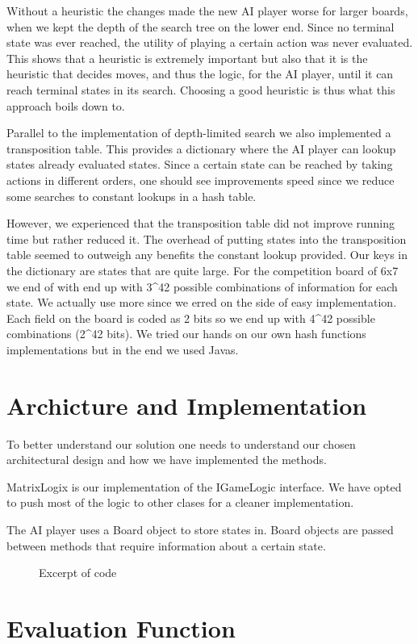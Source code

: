 \documentclass[11pt, a4paper]{article}
\begin{document}
Without a heuristic the changes made the new AI player worse for larger boards,
when we kept the depth of the search tree on the lower end. Since no terminal
state was ever reached, the utility of playing a certain action was never
evaluated. This shows that a heuristic is extremely important but also that it
is the heuristic that decides moves, and thus the logic, for the AI player,
until it can reach terminal states in its search. Choosing a good heuristic is
thus what this approach boils down to.

Parallel to the implementation of depth-limited search we also implemented a
transposition table. This provides a dictionary where the AI player can lookup
states already evaluated states. Since a certain state can be reached by taking
actions in different orders, one should see improvements speed since we
reduce some searches to constant lookups in a hash table. 

However, we experienced that the transposition table did not improve running
time but rather reduced it. The overhead of putting states into the
transposition table seemed to outweigh any benefits the constant lookup
provided. Our keys in the dictionary are states that are quite large. For the
competition board of 6x7 we end of with end up with 3^42 possible combinations
of information for each state. We actually use more since we erred on the side
of easy implementation. Each field on the board is coded as 2 bits so we end up
with 4^42 possible combinations (2^42 bits). We tried our hands on our own hash
functions implementations but in the end we used Javas.

\section*{Archicture and Implementation}
To better understand our solution one needs to understand our chosen
architectural design and how we have implemented the methods.

MatrixLogix is our implementation of the IGameLogic interface. We have opted to
push most of the logic to other clases for a cleaner implementation.

The AI player uses a Board object to store states in. Board objects are passed
between methods that require information about a certain state.




 



\begin{figure}

\caption{ Excerpt of code}\label{label1}
\end{figure}


\section*{Evaluation Function}
\end{document}
